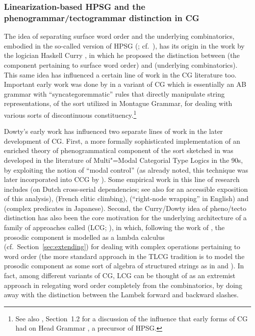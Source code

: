 \documentclass[output=paper
                ,modfonts
                ,nonflat
	        ,collection
	        ,collectionchapter
	        ,collectiontoclongg
 	        ,biblatex
                ,babelshorthands
                ,newtxmath
                ,draftmode
                ,colorlinks, citecolor=brown
]{./langsci/langscibook}
\begin{document}
\subsubsection{Linearization-based HPSG and the phenogrammar/tectogrammar distinction in CG }

The idea of separating surface word order and the underlying
combinatorics, embodied in the so-called 
version of HPSG (\citealt{Reape94a,Kathol2000a};
cf.\ ), has its origin 
in the work by the logician Haskell Curry \citeyearpar{curry61}, in which he
proposed the distinction between  (the component
pertaining to surface word order) and  (underlying
combinatorics). This same idea has influenced a certain line of work
in the CG literature too. Important early work was done by
\citet{Dowty82a-u,Dowty90a-Eng} in a variant of CG which is essentially an
AB grammar with ``syncategoremmatic'' rules that directly manipulate
string representations, of the sort utilized in Montague Grammar, for
dealing with various sorts of discontinuous constituency.\footnote{See
also , Section~1.2 for a discussion of the influence
that early forms of CG \citep{Bach79a,Bach80a,Dowty82a-u,Dowty82b} had
on Head Grammar \citep{Pollard84a-u}, a precursor of HPSG.}

Dowty's early work has influenced two separate lines of work in the
later development of CG. First, a more formally sophisticated
implementation of an enriched theory of phenogrammatical component of
the sort sketched in \citet{Dowty90a-Eng} was developed in the
literature of Multi"=Modal Categorial Type Logics 
in the 90s, by exploiting the notion of ``modal control'' (as
already noted, this technique was  
later incorporated into CCG by \citealt{Baldridge2002a-u}). Some empirical
work in this line of research includes \citet{moortgatoehrle94} (on Dutch
cross-serial dependencies; see also \citealt{Dowty97a-u} for an accessible
exposition of this analysis), \citet{kraak98} (French clitic climbing),
\citet{whitman2009} (``right-node wrapping'' in English) and
\citet{kubota-diss,Kubota2014a-u} (complex predicates in Japanese). Second,
the Curry/Dowty idea of pheno/tecto distinction has also been the core motivation for the
underlying architecture of
a family of approaches called  (LCG;
\citealt{oehrle1994,degroote01,muskens03,mihalicek-pollard10,pollard13}),
in which, following the work of \citet{oehrle1994},
the prosodic component is modelled as a lambda calculus
(cf.\ Section~\ref{sec:extending}) for
dealing with complex operations pertaining to word order
(the more standard approach in the TLCG tradition is to model the
prosodic component as some sort of algebra of structured strings as in
\citealt{moortgat1997} and \citealt{morrill-ea11}). 
In fact, among different variants of  
CG, LCG can be thought of as an extremist approach in
relegating word order completely from the combinatorics, by
doing away with the distinction between the Lambek forward and backward slashes.
\end{document}
